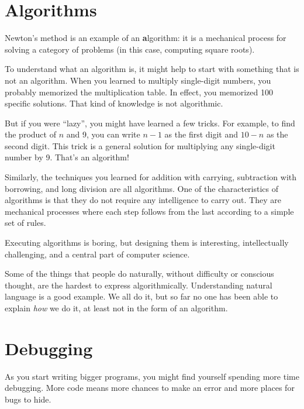 \documentclass[
DIV=11,
fontsize=13,
twoside,
headinclude=false,
titlepage=firstiscover,
abstract=true,
headsepline=true,
footsepline=true,
chapterprefix=true, %
headings=big,
bibliography=totoc,%
captions=tableheading
]{scrbook}
\theoremstyle{definition}
\begin{document}
\section{Algorithms}

Newton's method is an example of an {\textbf algorithm}: it is a
mechanical process for solving a category of problems (in this
case, computing square roots).

To understand what an algorithm is, it might help to start with
something that is not an algorithm.  When you learned to multiply
single-digit numbers, you probably memorized the multiplication table.
In effect, you memorized 100 specific solutions.  That kind of
knowledge is not algorithmic.

But if you were ``lazy'', you might have learned a few
tricks.  For example, to find the product of $n$ and 9, you can
write $n-1$ as the first digit and $10-n$ as the second
digit.  This trick is a general solution for multiplying any
single-digit number by 9.  That's an algorithm!

Similarly, the techniques you learned for addition with carrying,
subtraction with borrowing, and long division are all algorithms.  One
of the characteristics of algorithms is that they do not require any
intelligence to carry out.  They are mechanical processes where
each step follows from the last according to a simple set of rules.

Executing algorithms is boring, but designing them is interesting,
intellectually challenging, and a central part of computer science.

Some of the things that people do naturally, without difficulty or
conscious thought, are the hardest to express algorithmically.
Understanding natural language is a good example.  We all do it, but
so far no one has been able to explain {\em how} we do it, at least
not in the form of an algorithm.


\section{Debugging}
\label{bisectbug}

As you start writing bigger programs, you might find yourself
spending more time debugging.  More code means more chances to
make an error and more places for bugs to hide.
\end{document}
